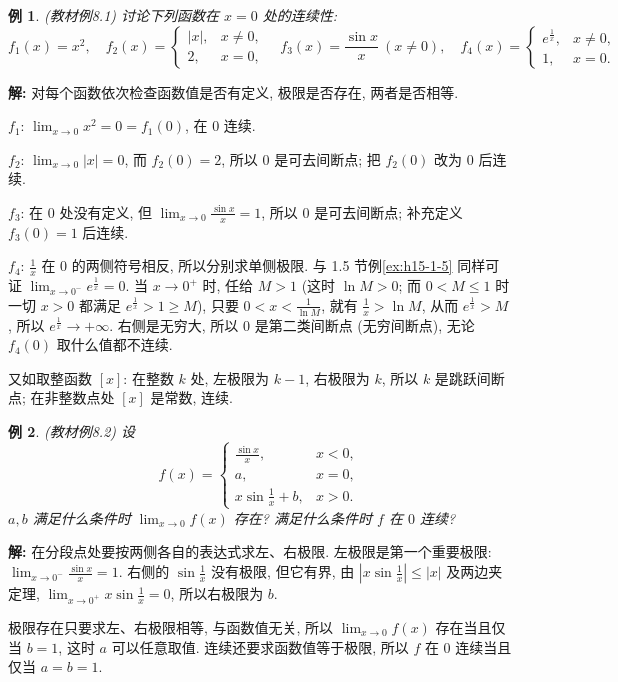 \documentclass[UTF8,openany]{ctexbook}
\theoremstyle{chinesetextbook}
\newtheorem{example}{例}[section]
\newenvironment{cnsolution}{\par\indent\textbf{解:} \ignorespaces}{\par}
\begin{document}
\begin{example}
\textnormal{(教材例8.1)} 讨论下列函数在 $x=0$ 处的连续性:
\[
f_1(x)=x^2,\quad f_2(x)=\begin{cases}|x|,&x\ne0,\\2,&x=0,\end{cases}\quad f_3(x)=\frac{\sin x}x\ (x\ne0),\quad f_4(x)=\begin{cases}e^{\frac1x},&x\ne0,\\1,&x=0.\end{cases}
\]
\end{example}
\begin{cnsolution}
对每个函数依次检查函数值是否有定义, 极限是否存在, 两者是否相等.

$f_1$: $\displaystyle\lim_{x\to0}x^2=0=f_1(0)$, 在 $0$ 连续.

$f_2$: $\displaystyle\lim_{x\to0}|x|=0$, 而 $f_2(0)=2$, 所以 $0$ 是可去间断点; 把 $f_2(0)$ 改为 $0$ 后连续.

$f_3$: 在 $0$ 处没有定义, 但 $\displaystyle\lim_{x\to0}\frac{\sin x}x=1$, 所以 $0$ 是可去间断点; 补充定义 $f_3(0)=1$ 后连续.

$f_4$: $\displaystyle\frac1x$ 在 $0$ 的两侧符号相反, 所以分别求单侧极限. 与 1.5 节例\ref{ex:h15-1-5} 同样可证 $\displaystyle\lim_{x\to0^-}e^{\frac1x}=0$. 当 $x\to0^+$ 时, 任给 $M>1$ (这时 $\ln M>0$; 而 $0<M\le1$ 时一切 $x>0$ 都满足 $e^{\frac1x}>1\ge M$), 只要 $\displaystyle0<x<\frac1{\ln M}$, 就有 $\displaystyle\frac1x>\ln M$, 从而 $e^{\frac1x}>M$, 所以 $e^{\frac1x}\to+\infty$. 右侧是无穷大, 所以 $0$ 是第二类间断点 (无穷间断点), 无论 $f_4(0)$ 取什么值都不连续.
\end{cnsolution}
又如取整函数 $[x]$: 在整数 $k$ 处, 左极限为 $k-1$, 右极限为 $k$, 所以 $k$ 是跳跃间断点; 在非整数点处 $[x]$ 是常数, 连续.
\begin{example}
\textnormal{(教材例8.2)} 设
\[
f(x)=\begin{cases}\frac{\sin x}x,&x<0,\\a,&x=0,\\x\sin\frac1x+b,&x>0.\end{cases}
\]
$a,b$ 满足什么条件时 $\displaystyle\lim_{x\to0}f(x)$ 存在? 满足什么条件时 $f$ 在 $0$ 连续?
\end{example}
\begin{cnsolution}
在分段点处要按两侧各自的表达式求左、右极限. 左极限是第一个重要极限: $\displaystyle\lim_{x\to0^-}\frac{\sin x}x=1$. 右侧的 $\displaystyle\sin\frac1x$ 没有极限, 但它有界, 由 $\displaystyle\left|x\sin\frac1x\right|\le|x|$ 及两边夹定理, $\displaystyle\lim_{x\to0^+}x\sin\frac1x=0$, 所以右极限为 $b$.

极限存在只要求左、右极限相等, 与函数值无关, 所以 $\displaystyle\lim_{x\to0}f(x)$ 存在当且仅当 $b=1$, 这时 $a$ 可以任意取值. 连续还要求函数值等于极限, 所以 $f$ 在 $0$ 连续当且仅当 $a=b=1$.
\end{cnsolution}
\end{document}
